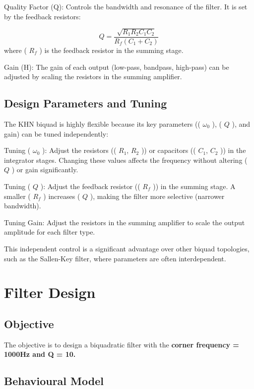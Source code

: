 \documentclass[
  letterpaper,
  DIV=11,
  numbers=noendperiod]{scrreprt}
\begin{document}
Quality Factor (Q): Controls the bandwidth and resonance of the filter.
It is set by the feedback resistors:

\[Q = \frac{\sqrt{R_1 R_2 C_1 C_2}}{R_f (C_1 + C_2)}\] where ( \(R_f\) )
is the feedback resistor in the summing stage.

Gain (H): The gain of each output (low-pass, bandpass, high-pass) can be
adjusted by scaling the resistors in the summing amplifier.

\section{Design Parameters and
Tuning}\label{design-parameters-and-tuning}

The KHN biquad is highly flexible because its key parameters ((
\(\omega_0\) ), ( \(Q\) ), and gain) can be tuned independently:

Tuning ( \(\omega_0\) ): Adjust the resistors (( \(R_1\), \(R_2\) )) or
capacitors (( \(C_1\), \(C_2\) )) in the integrator stages. Changing
these values affects the frequency without altering ( \(Q\) ) or gain
significantly.

Tuning ( \(Q\) ): Adjust the feedback resistor (( \(R_f\) )) in the
summing stage. A smaller ( \(R_f\) ) increases ( \(Q\) ), making the
filter more selective (narrower bandwidth).

Tuning Gain: Adjust the resistors in the summing amplifier to scale the
output amplitude for each filter type.

This independent control is a significant advantage over other biquad
topologies, such as the Sallen-Key filter, where parameters are often
interdependent.

\chapter{Filter Design}\label{filter-design}

\section{Objective}\label{objective}

The objective is to design a biquadratic filter with the \textbf{corner
frequency = 1000Hz and Q = 10.}

\section{Behavioural Model}\label{behavioural-model}
\end{document}
